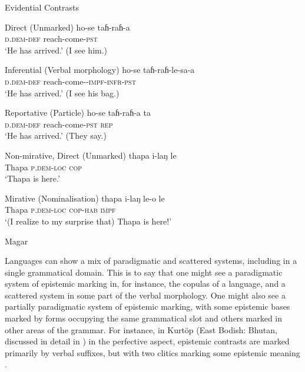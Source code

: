 \begin{exe}
        \ex Evidential Contrasts\label{e:Description:MagarScattered}
        \begin{xlist}
          \ex Direct (Unmarked)
          \gll ho-se taɦ-raɦ-a \\
          \textsc{d.dem-def} reach-come-\textsc{pst} \\
          \glt `He has arrived.' (I see him.)
      
          \ex Inferential (Verbal morphology)
          \gll ho-se taɦ-raɦ-le-sa-a \\
          \textsc{d.dem-def} reach-come-\textsc{-impf-infr-pst} \\
          \glt `He has arrived.' (I see his bag.)
      
          \ex Reportative (Particle)
          \gll ho-se taɦ-raɦ-a ta \\
          \textsc{d.dem-def} reach-come-\textsc{pst} \textsc{rep} \\
          \glt `He has arrived.' (They say.)

          \ex Non-mirative, Direct (Unmarked) \label{e:Description:MagarScattered:d}
          \gll thapa i-laŋ le \\
          Thapa \textsc{p.dem-loc} \textsc{cop} \\
          \glt `Thapa is here.'
      
          \ex Mirative (Nominalisation)\label{e:Description:MagarScattered:e}
          \gll thapa i-laŋ le-o le \\
          Thapa \textsc{p.dem-loc} \textsc{cop-hab} \textsc{impf} \\
          \glt `(I realize to my surprise that) Thapa is here!' 
        \end{xlist}
        Magar \cite[Magaric: Nepal,][480, 497]{GrunowHarsta2008}
      \end{exe}

Languages can show a mix of paradigmatic and scattered systems, including in a single grammatical domain. This is to say that one might see a paradigmatic system of epistemic marking in, for instance, the copulas of a language, and a scattered system in some part of the verbal morphology.  One might also see a partially paradigmatic system of epistemic marking, with some epistemic bases marked by forms occupying the same grammatical slot and others marked in other areas of the grammar. For instance, in Kurtöp (East Bodish: Bhutan, discussed in detail in ) in the perfective aspect, epistemic contrasts are marked primarily by verbal suffixes, but with two clitics marking some epistemic meaning \cite{Hyslop2014}.

